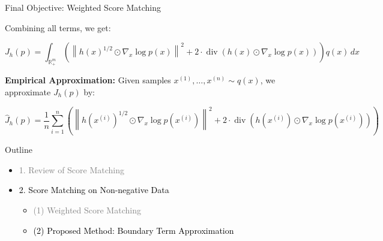 \documentclass[aspectratio=169]{beamer}
\begin{document}
\begin{frame}{Final Objective: Weighted Score Matching}

Combining all terms, we get:

\[
J_h(p) = \int_{\mathbb{R}_+^m} \left(
\left\| h(x)^{1/2} \odot \nabla_x \log p(x) \right\|^2 
+ 2 \cdot \operatorname{div}(h(x) \odot \nabla_x \log p(x)) 
\right) q(x)\, dx
\]

\vspace{1em}
\textbf{Empirical Approximation:}  
Given samples \( x^{(1)}, \dots, x^{(n)} \sim q(x) \), we approximate \( J_h(p) \) by:

\[
\hat{J}_h(p) = \frac{1}{n} \sum_{i=1}^n \left(
\left\| h(x^{(i)})^{1/2} \odot \nabla_x \log p(x^{(i)}) \right\|^2 
+ 2 \cdot \operatorname{div}(h(x^{(i)}) \odot \nabla_x \log p(x^{(i)})) 
\right)
\]

\end{frame}
\begin{frame}{Outline}

\begin{itemize}
  \item \textcolor{gray}{1. Review of Score Matching}
  \vspace{0.5em}
  \item \textcolor{black}{2. Score Matching on Non-negative Data}
  \begin{itemize}
    \item \textcolor{gray}{(1) Weighted Score Matching}
    \item \textcolor{black}{(2) Proposed Method: Boundary Term Approximation}
  \end{itemize}
\end{itemize}

\end{frame}
\end{document}
